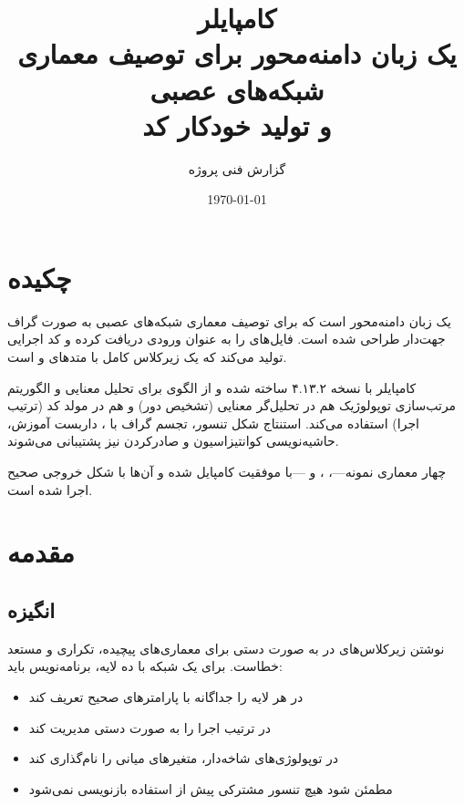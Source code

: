 \documentclass{nngraph-fa}
\title{
    \textbf{کامپایلر \LR{NNGraph DSL}} \\[0.5em]
    \large یک زبان دامنه‌محور برای توصیف معماری شبکه‌های عصبی \\
    و تولید خودکار کد \LR{PyTorch}
}
\author{\large گزارش فنی پروژه}
\date{\today}
\begin{document}
\maketitle
\tableofcontents
\newpage

\chapter*{چکیده}

 یک زبان دامنه‌محور است که برای توصیف
معماری شبکه‌های عصبی به صورت گراف جهت‌دار طراحی شده است.
فایل‌های  را به عنوان ورودی دریافت کرده و کد
 اجرایی تولید می‌کند که یک زیرکلاس 
کامل با متدهای  و  است.

کامپایلر با  نسخه ۴.۱۳.۲ ساخته شده و از الگوی
 برای تحلیل معنایی و الگوریتم مرتب‌سازی توپولوژیک
 هم در تحلیل‌گر معنایی (تشخیص دور) و هم در مولد کد
(ترتیب اجرا) استفاده می‌کند. استنتاج شکل تنسور، تجسم گراف با
، داربست آموزش، حاشیه‌نویسی کوانتیزاسیون و صادرکردن
 نیز پشتیبانی می‌شوند.

چهار معماری
نمونه---، ،  و
---با موفقیت کامپایل شده و
 آن‌ها با شکل خروجی صحیح اجرا شده است.

\chapter{مقدمه}

\section{انگیزه}

نوشتن زیرکلاس‌های  در  به صورت دستی
برای معماری‌های پیچیده، تکراری و مستعد خطاست. برای یک شبکه با
ده لایه، برنامه‌نویس باید:

\begin{itemize}
    \item در  هر لایه را جداگانه با پارامترهای صحیح
    تعریف کند
    \item در  ترتیب اجرا را به صورت دستی مدیریت کند
    \item در توپولوژی‌های شاخه‌دار، متغیرهای میانی را نام‌گذاری کند
    \item مطمئن شود هیچ تنسور مشترکی پیش از استفاده بازنویسی نمی‌شود
\end{itemize}
\end{document}
